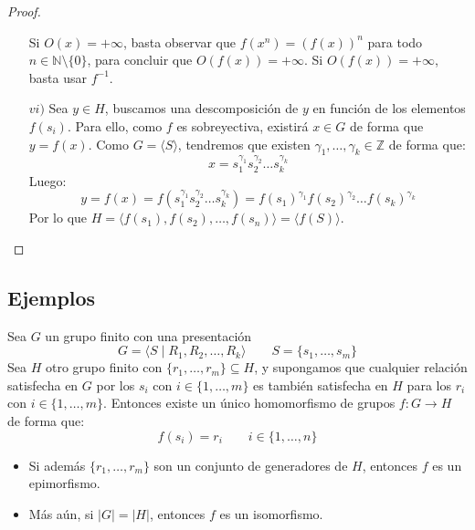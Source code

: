 \begin{prop}
\begin{proof}
\begin{enumerate}
                Si $O(x)=+\infty$, basta observar que $f(x^n) = {(f(x))}^{n}$ para todo $n\in \mathbb{N}\setminus\{0\}$, para concluir que $O(f(x))=+\infty$. Si $O(f(x))=+\infty$, basta usar $f^{-1}$.
            \item[$vi)$] Sea $y\in H$, buscamos una descomposición de $y$ en función de los elementos $f(s_i)$. Para ello, como $f$ es sobreyectiva, existirá $x\in G$ de forma que $y = f(x)$. Como $G=\langle S \rangle $, tendremos que existen $\gamma_1,\ldots,\gamma_k \in \mathbb{Z}$ de forma que:
                \begin{equation*}
                    x = s_1^{\gamma_1}s_2^{\gamma_2}\ldots s_k^{\gamma_k}
                \end{equation*}
                Luego:
                \begin{equation*}
                    y = f(x) = f(s_1^{\gamma_1}s_2^{\gamma_2}\ldots s_k^{\gamma_k}) = {f(s_1)}^{\gamma_1}{f(s_2)}^{\gamma_2} \ldots {f(s_k)}^{\gamma_k}
                \end{equation*}
                Por lo que $H = \langle f(s_1),f(s_2),\ldots,f(s_n) \rangle = \langle f(S) \rangle $.
        \end{enumerate}
    \end{proof}
\end{prop}

\subsection{Ejemplos}
\begin{teo}[de Dyck]\label{teo:Dyck}
    Sea $G$ un grupo finito con una presentación
    \begin{equation*}
        G = \langle S\mid R_1,R_2,\ldots,R_k \rangle \qquad S = \{s_1,\ldots,s_m\}
    \end{equation*}
    Sea $H$ otro grupo finito con $\{r_1,\ldots,r_m\}\subseteq H$, y supongamos que cualquier relación satisfecha en $G$ por los $s_i$ con $i \in \{1,\ldots,m\}$ es también satisfecha en $H$ para los $r_i$ con $i \in \{1,\ldots,m\}$. Entonces existe un único homomorfismo de grupos $f:G\to H$ de forma que:
    \begin{equation*}
        f(s_i) = r_i \qquad i \in \{1,\ldots,n\}
    \end{equation*}
    \begin{itemize}
        \item Si además $\{r_1,\ldots,r_m\}$ son un conjunto de generadores de $H$, entonces $f$ es un epimorfismo.
        \item Más aún, si $|G| = |H|$, entonces $f$ es un isomorfismo.
    \end{itemize}
\end{teo}

